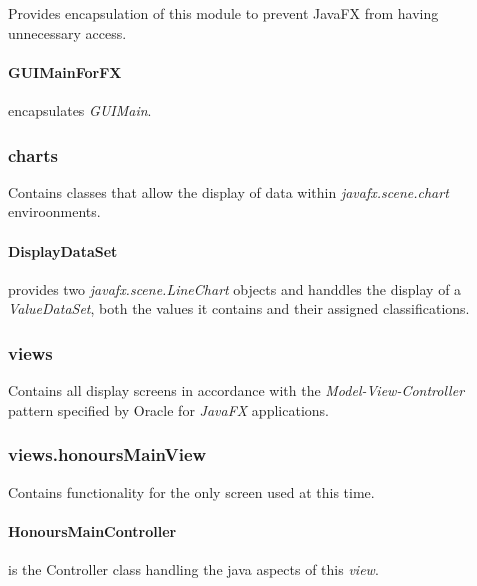 \documentclass{article}
\begin{document}
  Provides encapsulation of this module to prevent JavaFX from having unnecessary access.
  
  \paragraph{GUIMainForFX} encapsulates \textit{GUIMain}.
  
  \subsubsection*{charts}
  
  Contains classes that allow the display of data within \textit{javafx.scene.chart} enviroonments.
  
  \paragraph{DisplayDataSet} provides two \textit{javafx.scene.LineChart} objects and handdles the display of a \textit{ValueDataSet}, both the values it contains and their assigned classifications.
  
  \subsubsection*{views}
  
  Contains all display screens in accordance with the \textit{Model-View-Controller} pattern specified by Oracle for \textit{JavaFX} applications.
  
  \subsubsection*{views.honoursMainView}  
  
  Contains functionality for the only screen used at this time.
  
  \paragraph{HonoursMainController} is the Controller class handling the java aspects of this \textit{view}.
  
\end{document}
